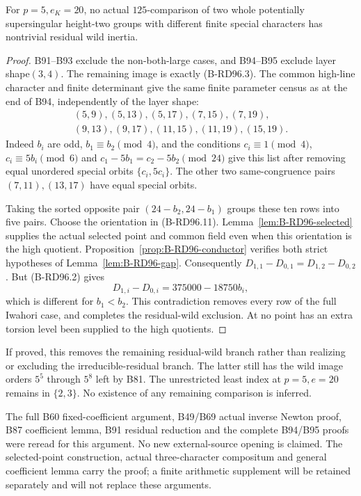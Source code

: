 \begin{theorem}
\label{thm:B-RD96-residual-wild}
For $p=5,e_K=20$, no actual $125$-comparison of two whole
potentially supersingular height-two groups with different finite
special characters has nontrivial residual wild inertia.
\end{theorem}
\begin{proof}
B91--B93 exclude the non-both-large cases, and B94--B95 exclude
layer shape$(3,4)$. The remaining image is exactly (B-RD96.3).
The common high-line character and finite determinant give the
same finite parameter census as at the end of B94, independently
of the layer shape:
\[
\begin{gathered}
 (5,9),(5,13),(5,17),(7,15),(7,19),\\
 (9,13),(9,17),(11,15),(11,19),(15,19).
\end{gathered}                                          \tag{B-RD96.18}
\]
Indeed $b_i$ are odd, $b_1\equiv b_2\pmod4$, and the conditions
$c_i\equiv1\pmod4$, $c_i\equiv5b_i\pmod6$ and
$c_1-5b_1=c_2-5b_2\pmod {24}$ give this list after removing
equal unordered special orbits $\{c_i,5c_i\}$. The other two
same-congruence pairs $(7,11),(13,17)$ have equal special orbits.

Taking the sorted opposite pair $(24-b_2,24-b_1)$ groups these
ten rows into five pairs. Choose the orientation in (B-RD96.11).
Lemma~\ref{lem:B-RD96-selected} supplies the actual selected
point and common field even when this orientation is the high
quotient. Proposition~\ref{prop:B-RD96-conductor} verifies
both strict hypotheses of Lemma~\ref{lem:B-RD96-gap}.
Consequently $D_{1,1}-D_{0,1}=D_{1,2}-D_{0,2}$. But (B-RD96.2)
gives
\[
              D_{1,i}-D_{0,i}=375000-18750b_i,
                                                        \tag{B-RD96.19}
\]
which is different for $b_1<b_2$. This contradiction removes
every row of the full Iwahori case, and completes the residual-wild
exclusion. At no point has an extra torsion level been supplied
to the high quotients.
\end{proof}

\begin{remark}
\label{rem:B-RD96-scope}
If proved, this removes the remaining residual-wild branch rather
than realizing or excluding the irreducible-residual branch.
The latter still has the wild image orders $5^5$ through $5^8$
left by B81. The unrestricted least index at $p=5,e=20$ remains
in $\{2,3\}$. No existence of any remaining comparison is inferred.

The full B60 fixed-coefficient argument, B49/B69 actual inverse
Newton proof, B87 coefficient lemma, B91 residual reduction and
the complete B94/B95 proofs were reread for this argument.
No new external-source opening is claimed. The selected-point
construction, actual three-character compositum and general
coefficient lemma carry the proof; a finite arithmetic supplement
will be retained separately and will not replace these arguments.
\end{remark}

